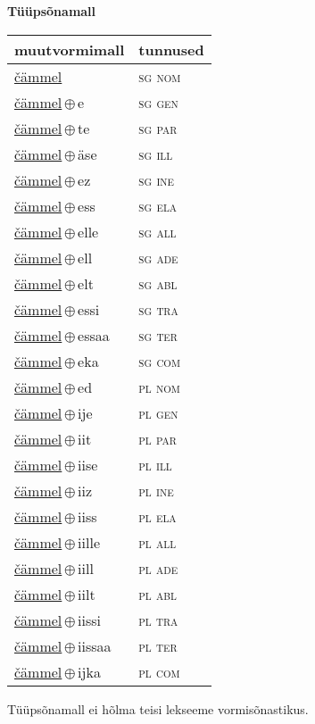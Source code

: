 

\vspace{3.5em}
\noindent \begin{minipage}{\textwidth}
\noindent \textbf{Tüüpsõnamall \,}\\

\begin{sideways}
\begin{tabular}{l l}
muutvormimall & tunnused \\
\hline
\underline{čämmel} & \textsc{ sg nom } \\
\underline{čämmel}\,$\oplus$\,e & \textsc{ sg gen } \\
\underline{čämmel}\,$\oplus$\,te & \textsc{ sg par } \\
\underline{čämmel}\,$\oplus$\,äse & \textsc{ sg ill } \\
\underline{čämmel}\,$\oplus$\,ez & \textsc{ sg ine } \\
\underline{čämmel}\,$\oplus$\,ess & \textsc{ sg ela } \\
\underline{čämmel}\,$\oplus$\,elle & \textsc{ sg all } \\
\underline{čämmel}\,$\oplus$\,ell & \textsc{ sg ade } \\
\underline{čämmel}\,$\oplus$\,elt & \textsc{ sg abl } \\
\underline{čämmel}\,$\oplus$\,essi & \textsc{ sg tra } \\
\underline{čämmel}\,$\oplus$\,essaa & \textsc{ sg ter } \\
\underline{čämmel}\,$\oplus$\,eka & \textsc{ sg com } \\
\underline{čämmel}\,$\oplus$\,ed & \textsc{ pl nom } \\
\underline{čämmel}\,$\oplus$\,ije & \textsc{ pl gen } \\
\underline{čämmel}\,$\oplus$\,iit & \textsc{ pl par } \\
\underline{čämmel}\,$\oplus$\,iise & \textsc{ pl ill } \\
\underline{čämmel}\,$\oplus$\,iiz & \textsc{ pl ine } \\
\underline{čämmel}\,$\oplus$\,iiss & \textsc{ pl ela } \\
\underline{čämmel}\,$\oplus$\,iille & \textsc{ pl all } \\
\underline{čämmel}\,$\oplus$\,iill & \textsc{ pl ade } \\
\underline{čämmel}\,$\oplus$\,iilt & \textsc{ pl abl } \\
\underline{čämmel}\,$\oplus$\,iissi & \textsc{ pl tra } \\
\underline{čämmel}\,$\oplus$\,iissaa & \textsc{ pl ter } \\
\underline{čämmel}\,$\oplus$\,ijka & \textsc{ pl com } \\
\end{tabular}
\end{sideways}
\label{tab:tüüpsõnamall-čämmel}

\end{minipage}

 
\vspace{1em}
\noindent Tüüpsõnamall  ei hõlma teisi lekseeme vormi\-sõnastikus.
